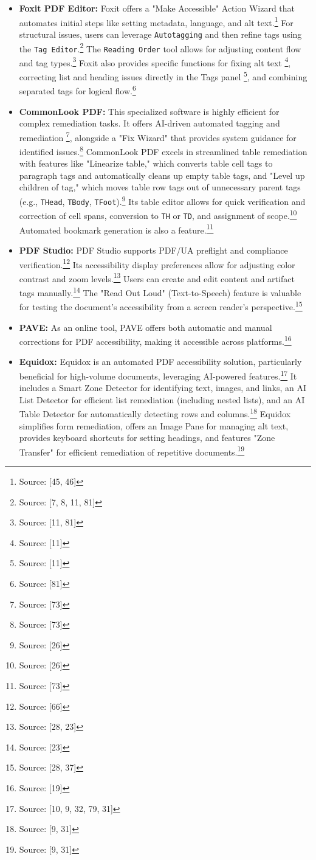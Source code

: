 \begin{itemize}[noitemsep,topsep=0pt]
    \item \textbf{Foxit PDF Editor:} Foxit offers a "Make Accessible" Action Wizard that automates initial steps like setting metadata, language, and alt text.\footnote{Source: [45, 46]} For structural issues, users can leverage \texttt{Autotagging} and then refine tags using the \texttt{Tag Editor}.\footnote{Source: [7, 8, 11, 81]} The \texttt{Reading Order} tool allows for adjusting content flow and tag types.\footnote{Source: [11, 81]} Foxit also provides specific functions for fixing alt text \footnote{Source: [11]}, correcting list and heading issues directly in the Tags panel \footnote{Source: [11]}, and combining separated tags for logical flow.\footnote{Source: [81]}
    \item \textbf{CommonLook PDF:} This specialized software is highly efficient for complex remediation tasks. It offers AI-driven automated tagging and remediation \footnote{Source: [73]}, alongside a "Fix Wizard" that provides system guidance for identified issues.\footnote{Source: [73]} CommonLook PDF excels in streamlined table remediation with features like "Linearize table," which converts table cell tags to paragraph tags and automatically cleans up empty table tags, and "Level up children of tag," which moves table row tags out of unnecessary parent tags (e.g., \texttt{THead}, \texttt{TBody}, \texttt{TFoot}).\footnote{Source: [26]} Its table editor allows for quick verification and correction of cell spans, conversion to \texttt{TH} or \texttt{TD}, and assignment of scope.\footnote{Source: [26]} Automated bookmark generation is also a feature.\footnote{Source: [73]}
    \item \textbf{PDF Studio:} PDF Studio supports PDF/UA preflight and compliance verification.\footnote{Source: [66]} Its accessibility display preferences allow for adjusting color contrast and zoom levels.\footnote{Source: [28, 23]} Users can create and edit content and artifact tags manually.\footnote{Source: [23]} The "Read Out Loud" (Text-to-Speech) feature is valuable for testing the document's accessibility from a screen reader's perspective.\footnote{Source: [28, 37]}
    \item \textbf{PAVE:} As an online tool, PAVE offers both automatic and manual corrections for PDF accessibility, making it accessible across platforms.\footnote{Source: [19]}
    \item \textbf{Equidox:} Equidox is an automated PDF accessibility solution, particularly beneficial for high-volume documents, leveraging AI-powered features.\footnote{Source: [10, 9, 32, 79, 31]} It includes a Smart Zone Detector for identifying text, images, and links, an AI List Detector for efficient list remediation (including nested lists), and an AI Table Detector for automatically detecting rows and columns.\footnote{Source: [9, 31]} Equidox simplifies form remediation, offers an Image Pane for managing alt text, provides keyboard shortcuts for setting headings, and features "Zone Transfer" for efficient remediation of repetitive documents.\footnote{Source: [9, 31]}
\end{itemize}

